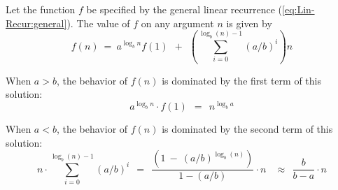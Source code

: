 \begin{theorem}
\label{thm:master-thm-genl}
Let the function $f$ be specified by the general linear recurrence (\ref{eq:Lin-Recur:general}). The value of $f$ on any argument $n$ is given by
\[
f(n) \ = \ 
a^{\log_b n} f(1) \ \ + \ \ \left( \sum_{i=0}^{\log_b (n)-1} (a/b)^i \right) n
\]

\smallskip

\noindent
When $a > b$, the behavior of $f(n)$ is dominated by the first term of this solution:
\[ a^{\log_b n} \cdot  f(1) \ \ = \ \ n^{\log_b a} \]

\smallskip

\noindent
When $a < b$, the behavior of $f(n)$ is dominated by the second term of this solution:
\[
n \cdot \sum_{i=0}^{\log_b (n)-1} (a/b)^i
  \ \ = \ \
\frac{\left( 1 \ - \  (a/b)^{\log_b (n)} \right)}{1- (a/b)} \cdot n \ \
  \ \ \approx \ \
\frac{b}{b - a} \cdot n
\]
\end{theorem}

